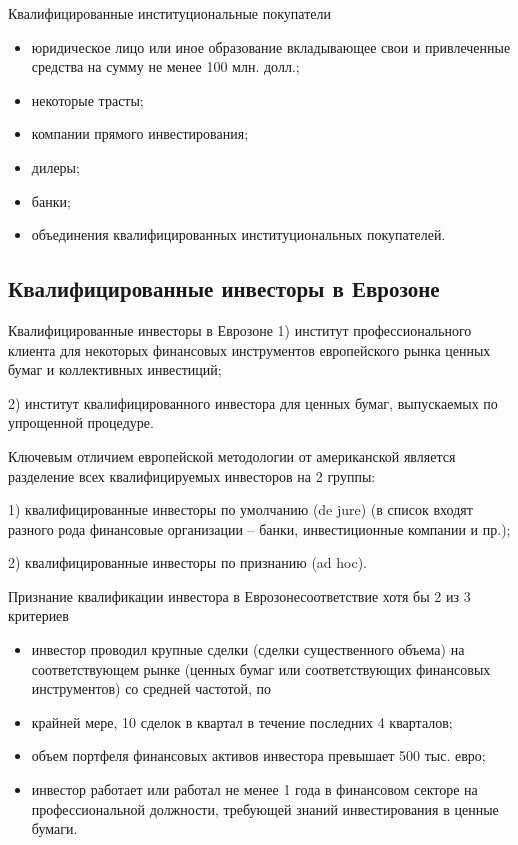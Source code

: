 \documentclass[_Venture_p1.tex]{subfiles}
\begin{document}
\begin{frame}{\setfontsize{12pt}Квалифицированные институциональные покупатели }
\begin{itemize}
	\item юридическое лицо или иное образование вкладывающее свои и привлеченные средства на сумму не менее 100 млн. долл.;
	\item некоторые трасты;
	\item компании прямого инвестирования;
	\item дилеры;
	\item банки;
	\item объединения квалифицированных институциональных покупателей.
\end{itemize}
\end{frame}
\subsection{Квалифицированные инвесторы в Еврозоне}
\begin{frame}{Квалифицированные инвесторы в Еврозоне}
1) институт профессионального клиента для некоторых финансовых инструментов европейского рынка ценных бумаг и коллективных инвестиций;

2) институт квалифицированного инвестора для ценных бумаг, выпускаемых по упрощенной процедуре.
\end{frame}

\begin{frame}
Ключевым отличием европейской методологии от американской является разделение всех квалифицируемых инвесторов на 2 группы:

1) квалифицированные инвесторы по умолчанию (de jure) (в список входят разного рода финансовые организации – банки, инвестиционные компании и пр.);

2) квалифицированные инвесторы по признанию (ad hoc).
\end{frame}

\begin{frame}{Признание квалификации инвестора в Еврозоне}{соответствие хотя бы 2 из 3 критериев}
\begin{itemize}
	\small
	\item [1)] инвестор проводил крупные сделки (сделки существенного объема) на соответствующем рынке (ценных бумаг или соответствующих финансовых инструментов) со средней частотой, по \item [2)] крайней мере, 10 сделок в квартал в течение последних 4 кварталов;
	\item [3)] объем портфеля финансовых активов инвестора превышает 500 тыс. евро;
	\item [4)] инвестор работает или работал не менее 1 года в финансовом секторе на профессиональной должности, требующей знаний инвестирования в ценные бумаги.
	
\end{itemize}
\end{frame}
\end{document}
